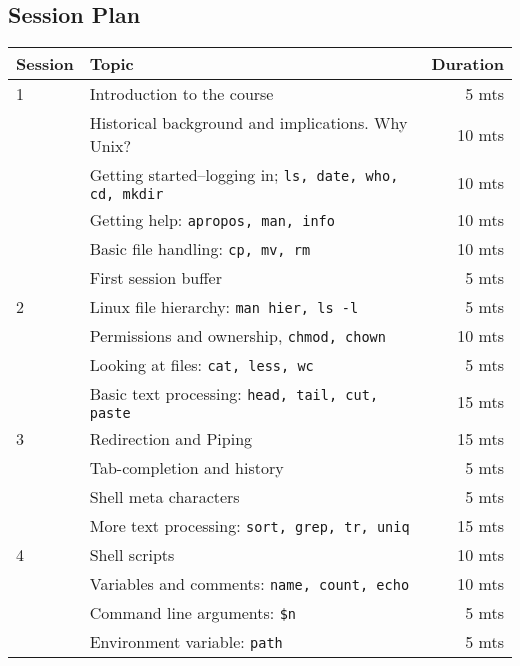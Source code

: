\documentclass{article}
\begin{document}
\subsection{Session Plan}
\begin{tabular}{llr}
\hline
Session & Topic & Duration\\\hline
1 & Introduction to the course                                       & ~5 mts\\
  & Historical background and implications. Why Unix?                & 10 mts\\
  & Getting started--logging in; \tt{ls, date, who, cd, mkdir}       & 10 mts\\
  & Getting help: \tt{apropos, man, info}                            & 10 mts\\
  & Basic file handling: \tt{cp, mv, rm}                             & 10 mts\\
  & First session buffer                                             & ~5 mts\\\hline

2 & Linux file hierarchy:  \tt{man hier, ls -l}                      & ~5 mts\\
  & Permissions and ownership, \tt{chmod, chown}                     & 10 mts\\
  & Looking at files: \tt{cat, less, wc}                             & ~5 mts\\
  & Basic text processing: \tt{head, tail, cut, paste}               & 15 mts\\\hline
    
3 & Redirection and Piping                                           & 15 mts\\
  & Tab-completion and history                                       & ~5 mts\\
  & Shell meta characters                                            & ~5 mts\\
  & More text processing: \tt{sort, grep, tr, uniq}                  & 15 mts\\ 

4 & Shell scripts                                                    & 10 mts\\
  & Variables and comments: \tt{name, count, echo}                   & 10 mts\\
  & Command line arguments: \tt{\$n}                                 & ~5 mts\\
  & Environment variable: \tt{path}                                  & ~5 mts\\\hline


\end{tabular}
\end{document}
